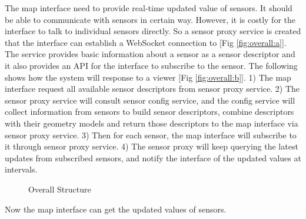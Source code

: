 \documentclass{article}
\begin{document}
The map interface need to provide real-time updated value of sensors. It should be able to communicate with sensors in certain way. However, it is costly for the interface to talk to individual sensors directly. So a sensor proxy service is created that the interface can establish a WebSocket connection to [Fig \ref{fig:overall:a}]. The service provides basic information about a sensor as a sensor descriptor and it also provides an API for the interface to subscribe to the sensor. The following shows how the system will response to a viewer [Fig \ref{fig:overall:b}]. 1) The map interface request all available sensor descriptors from sensor proxy service. 2) The sensor proxy service will consult sensor config service, and the config service will collect information from sensors to build sensor descriptors, combine descriptors with their geometry models and return those descriptors to the map interface via sensor proxy service. 3) Then for each sensor, the map interface will subscribe to it through sensor proxy service. 4) The sensor proxy will keep querying the latest updates from subscribed sensors, and notify the interface of the updated values at intervals.

\begin{figure}[htbp]
\centering
{}
\caption{Overall Structure}\label{fig:overall}
\end{figure}

Now the map interface can get the updated values of sensors.
\end{document}
